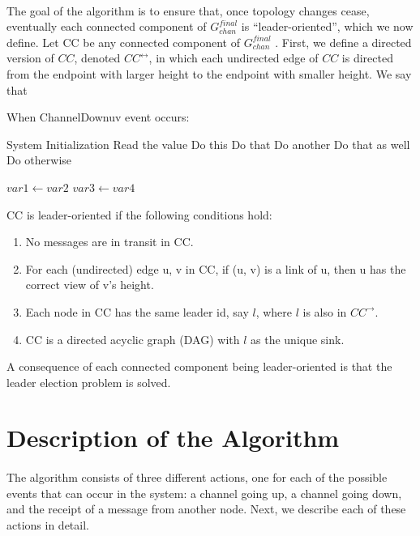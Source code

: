 \paragraph{}The goal of the algorithm is to ensure that, once topology changes cease, eventually each connected component of $G_{chan} ^{final}$ is “leader-oriented”, which we now define. Let CC be any connected component of $G_{chan} ^{final}$ . First, we define a directed version of $CC$, denoted $CC^{\longleftrightarrow}$, in which each undirected edge of $CC$ is directed from the endpoint with larger height to the endpoint with smaller height. We say that \begin{algorithm}
	\caption{When ChannelDownuv event occurs:}
	\begin{algorithmic}[1]
		
		\State System Initialization
		\State Read the value 
		\State Do this
		\State Do that
		\State Do another
		\State Do that as well
		\Else
		\State Do otherwise
		\EndIf
		\EndIf
		
		  
		\State $var1 \leftarrow var2$  
		\State $var3 \leftarrow var4$
		\EndWhile  \label{roy's loop}
		
	\end{algorithmic}
\end{algorithm}
CC is leader-oriented if the following conditions hold:
\begin{enumerate}
	\item No messages are in transit in CC.
	\item For each (undirected) edge {u, v} in CC, if (u, v) is a link of u, then u has the correct view of v’s height.
	\item  Each node in CC has the same leader id, say $l$, where $l$ is also in $CC^{\longrightarrow}$. 
	\item  CC is a directed acyclic graph (DAG) with $l$ as the unique sink.
\end{enumerate}
A consequence of each connected component being leader-oriented is that the leader election problem is solved.
\section{Description of the Algorithm}
\paragraph{}The algorithm consists of three different actions, one for each of the possible events that can occur in the system: a channel going up, a channel going down, and the receipt of a message from another node. Next, we describe each of these actions in detail.
